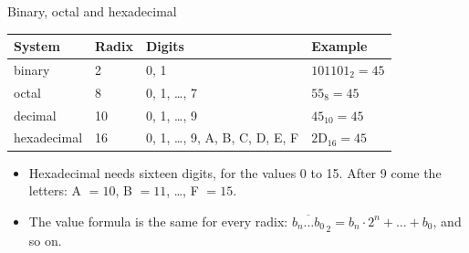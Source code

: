 \documentclass[10pt]{wosm-slides}
\newcommand*\base[2]{\ensuremath{\mathrm{#1}_{#2}}}
\begin{document}
\begin{frame}{Binary, octal and hexadecimal}
  \begin{center}
    \begin{tabular}{@{}llll@{}}
      \toprule
      System & Radix & Digits & Example \\
      \midrule
      binary & 2 & 0, 1 & $\base{101101}{2} = 45$ \\
      octal & 8 & 0, 1, \dots, 7 & $\base{55}{8} = 45$ \\
      decimal & 10 & 0, 1, \dots, 9 & $\base{45}{10} = 45$ \\
      hexadecimal & 16 & 0, 1, \dots, 9, A, B, C, D, E, F & $\base{2D}{16} = 45$ \\
      \bottomrule
    \end{tabular}
  \end{center}

  \medskip
  \begin{itemize}
    \item Hexadecimal needs sixteen digits, for the values 0 to 15. After 9 come
      the letters: A $= 10$, B $= 11$, \dots, F $= 15$.
    \item The value formula is the same for every radix:
      $\overline{b_n \dots b_0}_{\,2} = b_n \cdot 2^n + \dots + b_0$, and so on.
  \end{itemize}
\end{frame}
\end{document}
